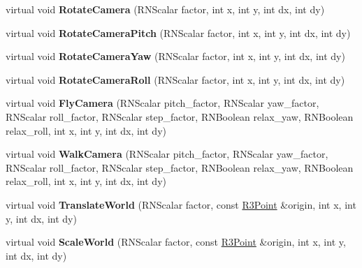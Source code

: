 \begin{DoxyCompactItemize}
\item 
virtual void {\bfseries Rotate\+Camera} (R\+N\+Scalar factor, int x, int y, int dx, int dy)\hypertarget{class_r3_viewer_a8cab186640179ee09d9a2ce2f323866f}{}\label{class_r3_viewer_a8cab186640179ee09d9a2ce2f323866f}

\item 
virtual void {\bfseries Rotate\+Camera\+Pitch} (R\+N\+Scalar factor, int x, int y, int dx, int dy)\hypertarget{class_r3_viewer_a3e82004974ea73856546a04ce8c5a859}{}\label{class_r3_viewer_a3e82004974ea73856546a04ce8c5a859}

\item 
virtual void {\bfseries Rotate\+Camera\+Yaw} (R\+N\+Scalar factor, int x, int y, int dx, int dy)\hypertarget{class_r3_viewer_a941068b829f894357e42e33c751c9d53}{}\label{class_r3_viewer_a941068b829f894357e42e33c751c9d53}

\item 
virtual void {\bfseries Rotate\+Camera\+Roll} (R\+N\+Scalar factor, int x, int y, int dx, int dy)\hypertarget{class_r3_viewer_ad23fb72d655799156cad7f2b95748710}{}\label{class_r3_viewer_ad23fb72d655799156cad7f2b95748710}

\item 
virtual void {\bfseries Fly\+Camera} (R\+N\+Scalar pitch\+\_\+factor, R\+N\+Scalar yaw\+\_\+factor, R\+N\+Scalar roll\+\_\+factor, R\+N\+Scalar step\+\_\+factor, R\+N\+Boolean relax\+\_\+yaw, R\+N\+Boolean relax\+\_\+roll, int x, int y, int dx, int dy)\hypertarget{class_r3_viewer_aae87a249761c440799f684ca629c2e9b}{}\label{class_r3_viewer_aae87a249761c440799f684ca629c2e9b}

\item 
virtual void {\bfseries Walk\+Camera} (R\+N\+Scalar pitch\+\_\+factor, R\+N\+Scalar yaw\+\_\+factor, R\+N\+Scalar roll\+\_\+factor, R\+N\+Scalar step\+\_\+factor, R\+N\+Boolean relax\+\_\+yaw, R\+N\+Boolean relax\+\_\+roll, int x, int y, int dx, int dy)\hypertarget{class_r3_viewer_a3325d75de1cc5e124cdf22dda14ed683}{}\label{class_r3_viewer_a3325d75de1cc5e124cdf22dda14ed683}

\item 
virtual void {\bfseries Translate\+World} (R\+N\+Scalar factor, const \hyperlink{class_r3_point}{R3\+Point} \&origin, int x, int y, int dx, int dy)\hypertarget{class_r3_viewer_ad63a6dd538b70375445dcf4589449411}{}\label{class_r3_viewer_ad63a6dd538b70375445dcf4589449411}

\item 
virtual void {\bfseries Scale\+World} (R\+N\+Scalar factor, const \hyperlink{class_r3_point}{R3\+Point} \&origin, int x, int y, int dx, int dy)\hypertarget{class_r3_viewer_a028fde05d8de05bd9844d566e694b434}{}\label{class_r3_viewer_a028fde05d8de05bd9844d566e694b434}


\end{DoxyCompactItemize}
